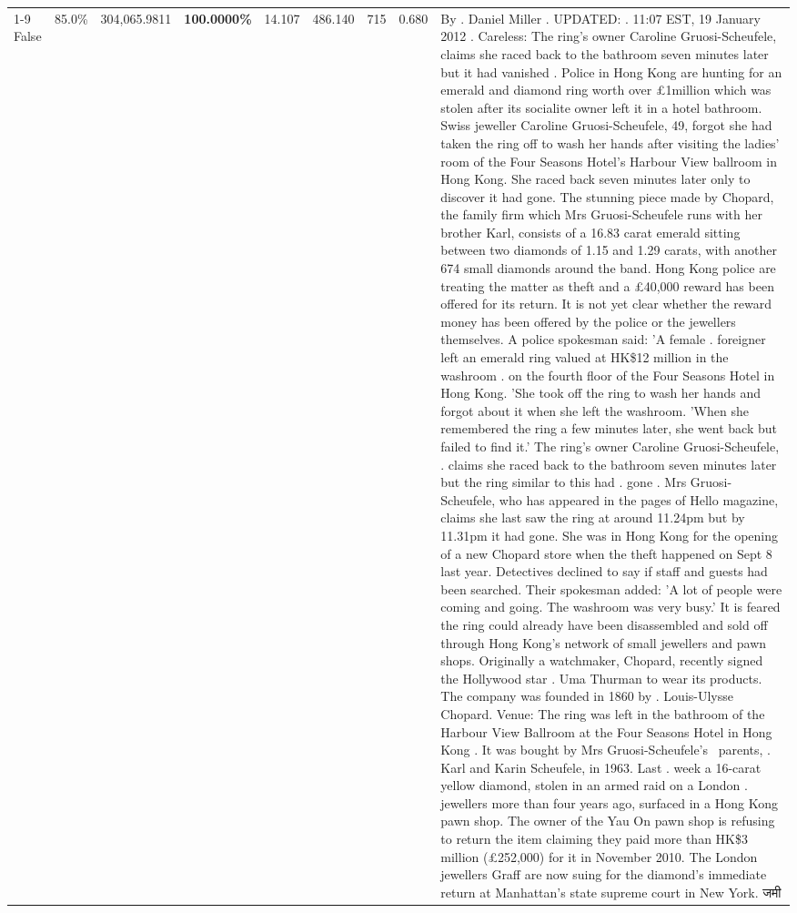 \begin{table}[H]
\begin{tabular}{lllrlllll}
\cline{1-9}
False & 85.0\% & 304,065.9811 & \bfseries \color{red} 100.0000\% & 14.107 & 486.140 & 715 & 0.680 & By . Daniel Miller . UPDATED: . 11:07 EST, 19 January 2012 . Careless: The ring's owner Caroline Gruosi-Scheufele, claims she raced back to the bathroom seven minutes later but it had vanished . Police in Hong Kong are hunting for an emerald and diamond ring worth over £1million which was stolen after its socialite owner left it in a hotel bathroom. Swiss jeweller Caroline Gruosi-Scheufele, 49, forgot she had taken the ring off to wash her hands after visiting the ladies' room of the Four Seasons Hotel's Harbour View ballroom in Hong Kong. She raced back seven minutes later only to discover it had gone. The stunning piece made by Chopard, the family firm which Mrs Gruosi-Scheufele runs with her brother Karl, consists of a 16.83 carat emerald sitting between two diamonds of 1.15 and 1.29 carats, with another 674 small diamonds around the band. Hong Kong police are treating the matter as theft and a £40,000 reward has been offered for its return. It is not yet clear whether the reward money has been offered by the police or the jewellers themselves. A police spokesman said: 'A female . foreigner left an emerald ring valued at HK\$12 million in the washroom . on the fourth floor of the Four Seasons Hotel in Hong Kong. 'She took off the ring to wash her hands and forgot about it when she left the washroom. 'When she remembered the ring a few minutes later, she went back but failed to find it.' The ring's owner Caroline Gruosi-Scheufele, . claims she raced back to the bathroom seven minutes later but the ring similar to this had . gone . Mrs Gruosi-Scheufele, who has appeared in the pages of Hello magazine, claims she last saw the ring at around 11.24pm but by 11.31pm it had gone. She was in Hong Kong for the opening of a new Chopard store when the theft happened on Sept 8 last year. Detectives declined to say if staff and guests had been searched. Their spokesman added: 'A lot of people were coming and going. The washroom was very busy.' It is feared the ring could already have been disassembled and sold off through Hong Kong's network of small jewellers and pawn shops. Originally a watchmaker, Chopard, recently signed the Hollywood star . Uma Thurman to wear its products. The company was founded in 1860 by . Louis-Ulysse Chopard. Venue: The ring was left in the bathroom of the Harbour View Ballroom at the Four Seasons Hotel in Hong Kong . It was bought by Mrs Gruosi-Scheufele's  parents, . Karl and Karin Scheufele, in 1963. Last . week a 16-carat yellow diamond, stolen in an armed raid on a London . jewellers more than four years ago, surfaced in a Hong Kong pawn shop. The owner of the Yau On pawn shop is refusing to return the item claiming they paid more than HK\$3 million (£252,000) for it in November 2010. The London jewellers Graff are now suing for the diamond’s immediate return at Manhattan’s state supreme court in New York. जमी \\

\end{tabular}
\end{table}
